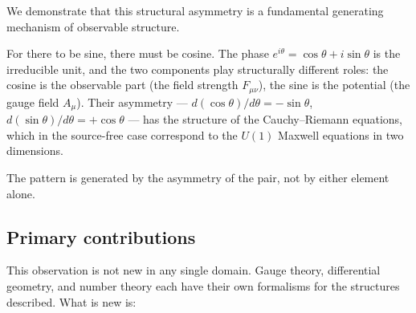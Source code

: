 \documentclass[12pt,a4paper]{article}
\theoremstyle{plain}
\theoremstyle{definition}
\theoremstyle{remark}
\begin{document}
We demonstrate that this structural asymmetry is a fundamental generating mechanism of observable structure.

For there to be sine, there must be cosine.
The phase $e^{i\theta} = \cos\theta + i\sin\theta$ is the irreducible unit,
and the two components play structurally different roles:
the cosine is the observable part (the field strength $F_{\mu\nu}$),
the sine is the potential (the gauge field $A_\mu$).
Their asymmetry --- $d(\cos\theta)/d\theta = -\sin\theta$,
$d(\sin\theta)/d\theta = +\cos\theta$ --- has the structure of the 
Cauchy--Riemann equations, which in the source-free case correspond to 
the $U(1)$ Maxwell equations in two dimensions.

The pattern is generated by the asymmetry of the pair, not by either element alone.

\subsection{Primary contributions}

This observation is not new in any single domain.
Gauge theory, differential geometry, and number theory each have their 
own formalisms for the structures described.
What is new is:
\end{document}
